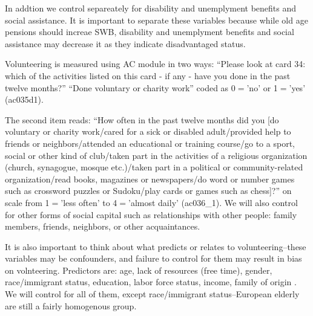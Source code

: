 \documentclass[10pt, letterpaper]{article}
\begin{document}
\begin{spacing}{1.4}
In addtion we control separeately for disability and unemplyment benefits and social
assistance. It is important to separate these variables because while old age
pensions should increae SWB, disability and unemplyment benefits and social
assistance may decrease it as they indicate disadvantaged status.

Volunteering is measured using AC module in two ways: ``Please look at card 34: which of the activities listed on this card - if any - have you done in the past twelve
months?'' ``Done voluntary or charity work'' coded as 0$=$'no' or 
1$=$'yes'  (ac035d1). 

The second item reads: ``How often in the past twelve
months did you [do voluntary or charity work/cared for a sick or disabled
adult/provided help to friends or neighbors/attended an educational or training
course/go to a sport, social or other kind of club/taken part in the activities
of a religious organization (church, synagogue, mosque etc.)/taken part in a
political or community-related organization/read books, magazines or
newspapers/do word or number games such as crossword puzzles or Sudoku/play
cards or games such as chess]?'' on scale from 1$=$'less often' to 4$=$'almost
daily' (ac036\_1). We will also control for other  forms of social capital such
as relationships with other people: family members, friends, neighbors, or other acquaintances. %
%
%
%

It is also important to think about what predicts or relates to
volunteering--these variables may be confounders, and failure to control for them may result in bias on
volnteering.  Predictors are: age, lack of resources (free
time), gender, race/immigrant status, education, labor force status, income,
family of origin \citet{wilson12,haski09}. %
 We will control for all of them, except race/immigrant status--European elderly
 are still a fairly homogenous group. 



\end{spacing}
\end{document}
